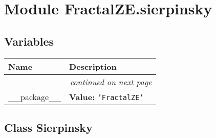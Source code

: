 %
%
%


\section{Module FractalZE.sierpinsky}

    \label{FractalZE:sierpinsky}


  \subsection{Variables}

    \vspace{-1cm}
\hspace{\varindent}\begin{longtable}{|p{\varnamewidth}|p{\vardescrwidth}|l}
\cline{1-2}
\cline{1-2} \centering \textbf{Name} & \centering \textbf{Description}& \\
\cline{1-2}
\endhead\cline{1-2}\multicolumn{3}{r}{\small\textit{continued on next page}}\\\endfoot\cline{1-2}
\endlastfoot\raggedright \_\-\_\-p\-a\-c\-k\-a\-g\-e\-\_\-\_\- & \raggedright \textbf{Value:} 
{\tt \texttt{'}\texttt{FractalZE}\texttt{'}}&\\
\cline{1-2}
\end{longtable}



\subsection{Class Sierpinsky}

